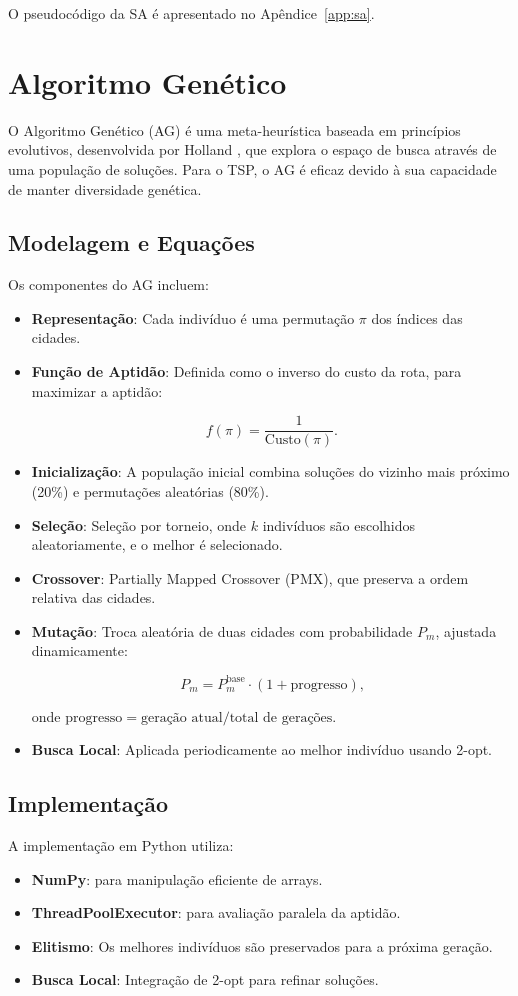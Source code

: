 \documentclass[11pt]{article}
\begin{document}
O pseudocódigo da SA é apresentado no Apêndice~\ref{app:sa}.

\section{Algoritmo Genético}
O Algoritmo Genético (AG) é uma meta-heurística baseada em princípios evolutivos, desenvolvida por Holland \cite{holland1992}, que explora o espaço de busca através de uma população de soluções. Para o TSP, o AG é eficaz devido à sua capacidade de manter diversidade genética.

\subsection{Modelagem e Equações}
Os componentes do AG incluem:
\begin{itemize}
    \item \textbf{Representação}: Cada indivíduo é uma permutação \(\pi\) dos índices das cidades.
    \item \textbf{Função de Aptidão}: Definida como o inverso do custo da rota, para maximizar a aptidão:

        \[
            f(\pi) = \frac{1}{\text{Custo}(\pi)}\text{.}
        \]
    
    \item \textbf{Inicialização}: A população inicial combina soluções do vizinho mais próximo (20\%) e permutações aleatórias (80\%).
    \item \textbf{Seleção}: Seleção por torneio, onde \(k\) indivíduos são escolhidos aleatoriamente, e o melhor é selecionado.
    \item \textbf{Crossover}: Partially Mapped Crossover (PMX), que preserva a ordem relativa das cidades.
    \item \textbf{Mutação}: Troca aleatória de duas cidades com probabilidade \(P_m\), ajustada dinamicamente:

        \[
        P_m = P_m^{\text{base}} \cdot (1 + \text{progresso})\text{,}
        \]

        onde \(\text{progresso} = \text{geração atual} / \text{total de gerações}\).
    \item \textbf{Busca Local}: Aplicada periodicamente ao melhor indivíduo usando 2-opt.
\end{itemize}

\subsection{Implementação}
A implementação em Python utiliza:
\begin{itemize}
    \item \textbf{NumPy}: para manipulação eficiente de arrays.
    \item \textbf{ThreadPoolExecutor}: para avaliação paralela da aptidão.
    \item \textbf{Elitismo}: Os melhores indivíduos são preservados para a próxima geração.
    \item \textbf{Busca Local}: Integração de 2-opt para refinar soluções.
\end{itemize}
\end{document}
